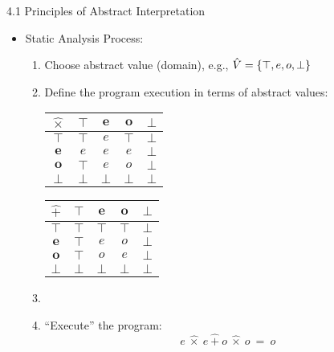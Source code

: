 \documentclass[10pt]{beamer}
\begin{document}
	\begin{frame}{4.1 Principles of Abstract Interpretation}
		\begin{itemize}
			\item Static Analysis Process:
			\begin{enumerate}
				\item Choose abstract value (domain), e.g., $\hat{V}=\set{\top,e,o,\bot}$
				\item Define the program execution in terms of abstract values:\ \\ \begin{center}
					\begin{minipage}{.4\textwidth}\begin{tabular}{|c|c|c|c|c|}
							\hline $\hat{\times}$ & $\boldsymbol{\top}$ & $\boldsymbol{e}$ & $\boldsymbol{o}$ & $\boldsymbol{\bot}$ \\ \hline
							$\boldsymbol{\top}$ & $\top$ & $e$ & $\top$ & $\bot$ \\ \hline
							$\boldsymbol{e}$ & $e$ & $e$ & $e$ & $\bot$ \\ \hline
							$\boldsymbol{o}$ & $\top$ & $e$ & $o$ & $\bot$ \\ \hline
							$\boldsymbol{\bot}$ & $\bot$ & $\bot$ & $\bot$ & $\bot$ \\ \hline
						\end{tabular}
					\end{minipage}\begin{minipage}{.4\textwidth}\begin{tabular}{|c|c|c|c|c|}
						\hline $\hat{+}$ & $\boldsymbol{\top}$ & $\boldsymbol{e}$ & $\boldsymbol{o}$ & $\boldsymbol{\bot}$ \\ \hline
						$\boldsymbol{\top}$ & $\top$ & $\top$ & $\top$ & $\bot$ \\ \hline
						$\boldsymbol{e}$ & $\top$ & $e$ & $o$ & $\bot$ \\ \hline
						$\boldsymbol{o}$ & $\top$ & $o$ & $e$ & $\bot$ \\ \hline
						$\boldsymbol{\bot}$ & $\bot$ & $\bot$ & $\bot$ & $\bot$ \\ \hline
					\end{tabular}
				\end{minipage}
				\end{center}
				\item[]
				\item ``Execute'' the program: \[
				e\ \hat{\times}\ e\ \hat{+}\ o\ \hat{\times}\ o\ =\ o
				\]
			\end{enumerate}
		\end{itemize}
	\end{frame}
	
\end{document}

